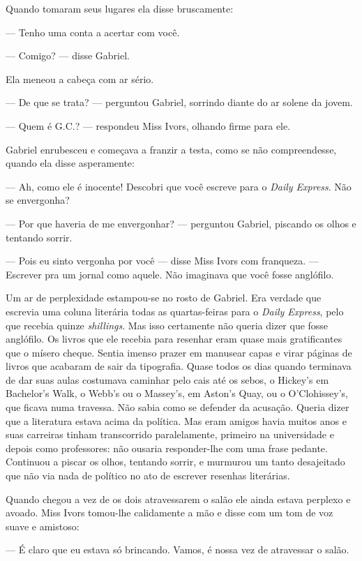 Quando tomaram seus lugares ela disse bruscamente:

--- Tenho uma conta a acertar com você.

--- Comigo? --- disse Gabriel.

Ela meneou a cabeça com ar sério.

--- De que se trata? --- perguntou Gabriel, sorrindo diante do ar solene da
jovem.

--- Quem é G.C.? --- respondeu Miss Ivors, olhando firme para ele.

Gabriel enrubesceu e começava a franzir a testa, como se não compreendesse,
quando ela disse asperamente:

--- Ah, como ele é inocente!  Descobri que você escreve para o \textit{Daily
Express}.  Não se envergonha?

--- Por que haveria de me envergonhar? --- perguntou Gabriel, piscando os olhos
e tentando sorrir.

--- Pois eu sinto vergonha por você --- disse Miss Ivors com franqueza.  ---
Escrever pra um jornal como aquele.  Não imaginava que você fosse anglófilo.

Um ar de perplexidade estampou-se no rosto de Gabriel.  Era verdade que
escrevia uma coluna literária todas as quartas-feiras para o \textit{Daily
Express}, pelo que recebia quinze \textit{shillings}.  Mas isso certamente não
queria dizer que fosse anglófilo.  Os livros que ele recebia para resenhar eram
quase mais gratificantes que o mísero cheque.  Sentia imenso prazer em manusear
capas e virar páginas de livros que acabaram de sair da tipografia.
Quase todos os dias quando terminava de dar suas aulas costumava caminhar pelo
cais até os sebos, o Hickey’s em Bachelor’s Walk, o Webb’s ou o Massey’s, em
Aston’s Quay, ou o O’Clohissey’s, que ficava numa travessa.  Não sabia como se
defender da acusação.  Queria dizer que a literatura estava acima da política.
Mas eram amigos havia muitos anos e suas carreiras tinham transcorrido
paralelamente, primeiro na universidade e depois como professores: não ousaria
responder-lhe com uma frase pedante.  Continuou a piscar os olhos, tentando
sorrir, e murmurou um tanto desajeitado que não via nada de político no ato de
escrever resenhas literárias.

Quando chegou a vez de os dois atravessarem o salão ele ainda estava perplexo e
avoado.  Miss Ivors tomou-lhe calidamente a mão e disse com um tom de voz suave
e amistoso:

--- É claro que eu estava só brincando.  Vamos, é nossa vez de atravessar o
salão.

